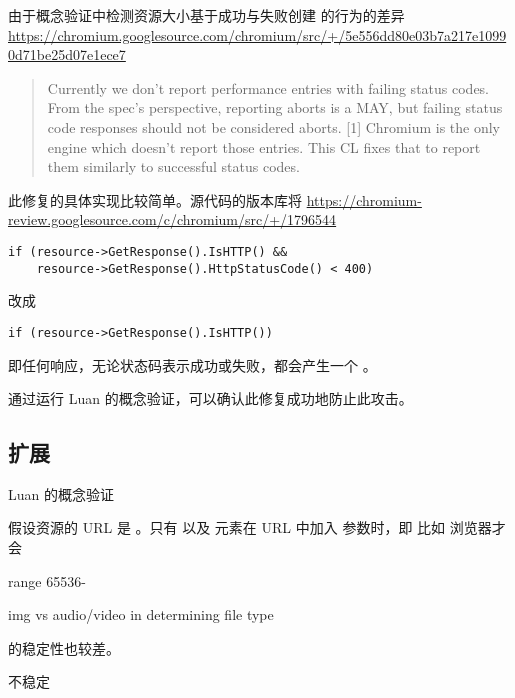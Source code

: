 由于概念验证中检测资源大小基于成功与失败创建  的行为的差异 \url{https://chromium.googlesource.com/chromium/src/+/5e556dd80e03b7a217e10990d71be25d07e1ece7}

\begin{quote}
    Currently we don't report performance entries with failing status codes.
    From the spec's perspective, reporting aborts is a MAY, but failing
    status code responses should not be considered aborts. [1]
    Chromium is the only engine which doesn't report those entries.
    This CL fixes that to report them similarly to successful status codes.
\end{quote}

此修复的具体实现比较简单。源代码的版本库将 \url{https://chromium-review.googlesource.com/c/chromium/src/+/1796544}

\begin{lstlisting}
if (resource->GetResponse().IsHTTP() &&
    resource->GetResponse().HttpStatusCode() < 400)
\end{lstlisting}

改成 

\begin{lstlisting}
if (resource->GetResponse().IsHTTP())
\end{lstlisting}


即任何响应，无论状态码表示成功或失败，都会产生一个 。


通过运行 Luan 的概念验证，可以确认此修复成功地防止此攻击。

\subsection{扩展}

Luan 的概念验证

假设资源的 URL 是 。只有  以及  元素在 URL 中加入  参数时，即 比如 浏览器才会


range 65536-

img vs audio/video in determining file type

 的稳定性也较差。


不稳定